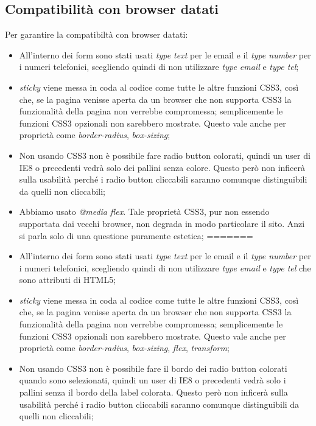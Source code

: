 \subsection{Compatibilità con browser datati}
Per garantire la compatibiltà con browser datati:
\begin{itemize}
<<<<<<< HEAD
\item All’interno dei form sono stati usati \textit{type text} per le email e il \textit{type number} per i numeri telefonici, scegliendo quindi di non utilizzare \textit{type email} e \textit{type tel};
\item \textit{sticky} viene messa in coda al codice come tutte le altre funzioni CSS3,  così che, se la pagina venisse aperta da un browser che non supporta CSS3 la funzionalità della pagina non verrebbe compromessa; semplicemente le funzioni CSS3 opzionali non sarebbero mostrate. Questo vale anche per proprietà come \textit{border-radius}, \textit{box-sizing};
\item Non usando CSS3 non è possibile fare radio button colorati, quindi un user di IE8 o precedenti vedrà solo dei pallini senza colore. Questo però non inficerà sulla usabilità perché i radio button cliccabili saranno comunque distinguibili da quelli non cliccabili;
\item Abbiamo usato \textit{@media flex}. Tale proprietà CSS3, pur non essendo supportata dai vecchi browser, non degrada in modo particolare il sito. Anzi si parla solo di una questione puramente estetica;
=======
\item All’interno dei form sono stati usati \textit{type text} per le email e il \textit{type number} per i numeri telefonici, scegliendo quindi di non utilizzare \textit{type email} e \textit{type tel} che sono attributi di HTML5;
\item \textit{sticky} viene messa in coda al codice come tutte le altre funzioni CSS3,  così che, se la pagina venisse aperta da un browser che non supporta CSS3 la funzionalità della pagina non verrebbe compromessa; semplicemente le funzioni CSS3 opzionali non sarebbero mostrate. Questo vale anche per proprietà come \textit{border-radius}, \textit{box-sizing}, \textit{flex}, \textit{transform};
\item Non usando CSS3 non è possibile fare il bordo dei radio button colorati quando sono selezionati, quindi un user di IE8 o precedenti vedrà solo i pallini senza il bordo della label colorata. Questo però non inficerà sulla usabilità perché i radio button cliccabili saranno comunque distinguibili da quelli non cliccabili;

\end{itemize}
